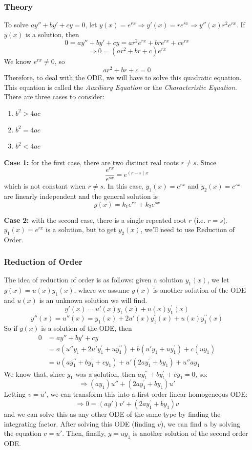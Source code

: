 \documentclass[11pt]{article}
\newcommand{\yp}{y^{\prime}}
\newcommand{\ypp}{y^{\prime\prime}}
\begin{document}
\subsubsection{Theory}
	To solve $a y'' + b y' + c y = 0$, let $y(x) = e^{rx} \Rightarrow y'(x) = r e^{rx} \Rightarrow y''(x) r^2 e^{rx}$. If $y(x)$ is a solution, then
		$$ 0 = ay'' + by' + cy = a r^2 e^{rx} + b r e^{rx} + c e^{rx} $$
		$$ \Rightarrow 0 = (a r^2 + b r + c) e^{rx} $$
	We know $e^{rx} \neq 0$, so
		$$ a r^2 + b r + c = 0 $$
	Therefore, to deal with the ODE, we will have to solve this quadratic equation. This equation is called the \emph{Auxiliary Equation} or the \emph{Characteristic Equation}. There are three cases to consider:
		\begin{enumerate}
			\item $b^2 > 4ac$
			\item $b^2 = 4ac$
			\item $b^2 < 4ac$
		\end{enumerate}
	\textbf{Case 1:} for the first case, there are two distinct real roots $r \neq s$. Since
		$$ \frac{e^{rx}}{e^{sx}} = e^{(r-s)x} $$
	which is not constant when $r \neq s$. In this case, $y_1 (x) = e^{rx}$ and $y_2 (x) = e^{sx}$ are linearly independent and the general solution is
		$$ y(x) = k_1 e^{rx} + k_2 e^{sx} $$

	\textbf{Case 2:} with the second case, there is a single repeated root $r$ (i.e. $r = s$). $y_1(x) = e^{rx}$ is a solution, but to get $y_2(x)$, we'll need to use Reduction of Order.

\subsubsection{Reduction of Order}
	The idea of reduction of order is as follows: given a solution $y_1 (x)$, we let $y(x) = u(x) y_1 (x)$, where we assume $y(x)$ is another solution of the ODE and $u(x)$ is an unknown solution we will find.
		$$ y'(x) = u'(x) y_1 (x) + u (x) \yp_1 (x) $$
		$$ y''(x) = u''(x) = y_1(x) + 2 u'(x) \yp_1 (x) + u(x)\ypp_1(x) $$
	So if $y(x)$ is a solution of the ODE, then
		\begin{align*}
			0 &= ay'' + by' + cy \\
				&= a(u'' y_1 + 2 u' \yp_1 + u \ypp_1) + b(u' y_1 + u \yp_1) + c (u y_1) \\
				&= u(a\ypp_1 + b\yp_1 + c y_1) + u'(2a\yp_1 + by_1) + u'' a y_1
		\end{align*}
	We know that, since $y_1$ was a solution, then $a\ypp_1 + b\yp_1 + c y_1 = 0$, so:
		$$ \Rightarrow (ay_1) u'' + (2a\yp_1 + by_1) u' $$
	Letting $v = u'$, we can transform this into a first order linear homogeneous ODE:
		$$ \Rightarrow 0 = (ay') v' + (2a\yp_1 + by_1) v $$
	and we can solve this as any other ODE of the same type by finding the integrating factor. After solving this ODE (finding $v$), we can find $u$ by solving the equation $v = u'$. Then, finally, $y = u y_1$ is another solution of the second order ODE.
\end{document}
